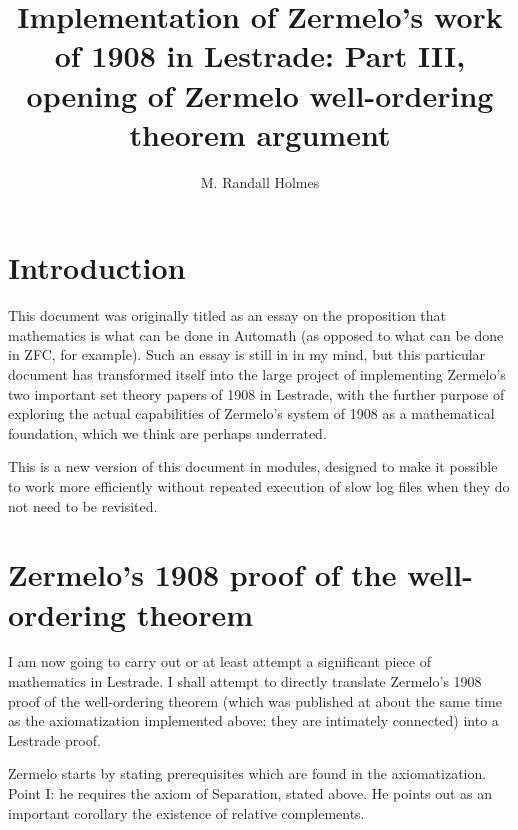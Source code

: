 \documentclass[12pt]{article}
\title{Implementation of Zermelo's work of 1908 in Lestrade:  Part III, opening of Zermelo well-ordering theorem argument}
\author{M. Randall Holmes}
\begin{document}
\maketitle

\section{Introduction}
 
This document was originally titled as an essay on the proposition that mathematics is what can be done in Automath (as opposed to what can be done in ZFC, for example).  Such an essay is still in in my mind, but this particular document has transformed itself into the large project of implementing Zermelo's two important set theory papers of 1908 in Lestrade, with the further purpose of exploring the actual capabilities of Zermelo's system of 1908 as a mathematical foundation, which we think are perhaps underrated.

This is a new version of this document in modules, designed to make it possible to work more efficiently without repeated execution of slow log files when they do not need to be revisited.

\section{Zermelo's 1908 proof of the well-ordering theorem}

I am now going to carry out or at least attempt a significant piece of mathematics in Lestrade.  I shall attempt to directly translate Zermelo's 1908 proof of the well-ordering theorem
(which was published at about the same time as the axiomatization implemented above:  they are intimately connected) into a Lestrade proof.

Zermelo starts by stating prerequisites which are found in the axiomatization.  Point I:  he requires the axiom of Separation, stated above.  He points out as an important corollary the existence of
relative complements.
\end{document}

